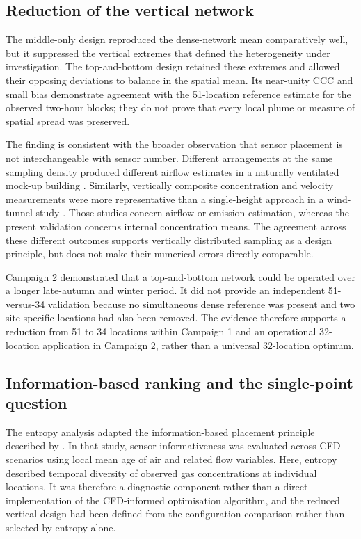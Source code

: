 \documentclass[12pt,a4paper]{article}
\begin{document}
\subsection{Reduction of the vertical network}

The middle-only design reproduced the dense-network mean comparatively well,
but it suppressed the vertical extremes that defined the heterogeneity under
investigation. The top-and-bottom design retained these extremes and allowed
their opposing deviations to balance in the spatial mean. Its near-unity CCC
and small bias demonstrate agreement with the 51-location reference estimate
for the observed two-hour blocks; they do not prove that every local plume or
measure of spatial spread was preserved.

The finding is consistent with the broader observation that sensor placement
is not interchangeable with sensor number. Different arrangements at the same
sampling density produced different airflow estimates in a naturally
ventilated mock-up building \citep{DeVogeleer2017}. Similarly, vertically
composite concentration and velocity measurements were more representative
than a single-height approach in a wind-tunnel study
\citep{Janke2020}. Those studies concern airflow or emission estimation,
whereas the present validation concerns internal concentration means. The
agreement across these different outcomes supports vertically distributed
sampling as a design principle, but does not make their numerical errors
directly comparable.

Campaign 2 demonstrated that a top-and-bottom network could be operated over
a longer late-autumn and winter period. It did not provide an independent
51-versus-34 validation because no simultaneous dense reference was present
and two site-specific locations had also been removed. The evidence therefore
supports a reduction from 51 to 34 locations within Campaign 1 and an
operational 32-location application in Campaign 2, rather than a universal
32-location optimum.

\subsection{Information-based ranking and the single-point question}

The entropy analysis adapted the information-based placement principle
described by \citet{Chen2026}. In that study,
sensor informativeness was evaluated across CFD scenarios using local mean age
of air and related flow variables. Here, entropy described temporal diversity
of observed gas concentrations at individual locations. It was therefore a
diagnostic component rather than a direct implementation of the CFD-informed
optimisation algorithm, and the reduced vertical design had been defined from
the configuration comparison rather than selected by entropy alone.
\end{document}
